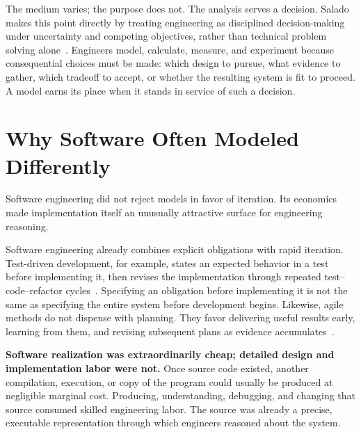 The medium varies; the purpose does not. The analysis serves a decision. Salado makes this point directly by treating engineering as disciplined decision-making under uncertainty and competing objectives, rather than technical problem solving alone~\citep{salado2026}. Engineers model, calculate, measure, and experiment because consequential choices must be made: which design to pursue, what evidence to gather, which tradeoff to accept, or whether the resulting system is fit to proceed. A model earns its place when it stands in service of such a decision.

\section{Why Software Often Modeled Differently}\label{heading:why-software-often-modeled-differently}

Software engineering did not reject models in favor of iteration. Its economics made implementation itself an unusually attractive surface for engineering reasoning.

Software engineering already combines explicit obligations with rapid iteration. Test-driven development, for example, states an expected behavior in a test before implementing it, then revises the implementation through repeated test–code–refactor cycles~\citep{beck2003tdd}. Specifying an obligation before implementing it is not the same as specifying the entire system before development begins. Likewise, agile methods do not dispense with planning. They favor delivering useful results early, learning from them, and revising subsequent plans as evidence accumulates~\citep{agile-principles2001}.

\textbf{Software realization was extraordinarily cheap; detailed design and implementation labor were not.} Once source code existed, another compilation, execution, or copy of the program could usually be produced at negligible marginal cost. Producing, understanding, debugging, and changing that source consumed skilled engineering labor. The source was already a precise, executable representation through which engineers reasoned about the system.


